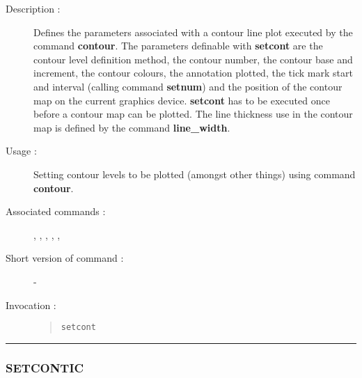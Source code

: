\begin{description}

\item[Description :] Defines the parameters associated with a contour
line plot executed by the command {\bf contour}.  The parameters
definable with {\bf setcont} are the contour level definition method,
the contour number, the contour base and increment, the contour
colours, the annotation plotted, the tick mark start and interval
(calling command {\bf setnum}) and the position of the contour map on
the current graphics device.  {\bf setcont} has to be executed once
before a contour map can be plotted.  The line thickness use in the
contour map is defined by the command {\bf line\_width}.

\item[Usage :] Setting contour levels to be plotted (amongst other
things) using command {\bf contour}.

\item[Associated commands :] {\tt {}},
{\tt {}}, {\tt {}},
{\tt {}}, {\tt {}},
{\tt {}}

\item[Short version of command :] -
\item[Invocation :]

\begin{quote}{\tt  setcont }\end{quote}

\end{description}

\hrule
\subsubsection*{\label{SETCONTIC}SETCONTIC}

